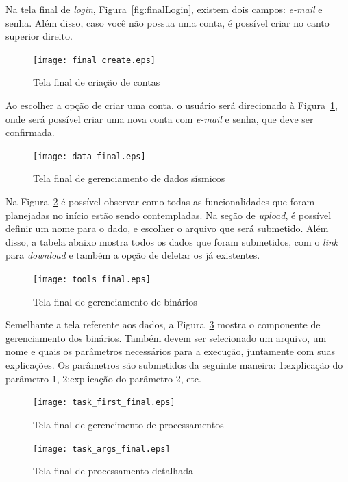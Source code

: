 \documentclass[11pt,twoside]{article}
\begin{document}
Na tela final de \emph{login}, Figura~\ref{fig:finalLogin}, existem dois campos: \emph{e-mail} e senha. Além disso, caso você não possua uma conta, é possível criar no canto superior direito.

\begin{figure}[!h]
  \centering
  \texttt{[image: final\_create.eps]}
  \caption{Tela final de criação de contas}
  \label{fig:finalCreate}
\end{figure}

 Ao escolher a opção de criar uma conta, o usuário será direcionado à Figura~\ref{fig:finalCreate}, onde será possível criar uma nova conta com \emph{e-mail} e senha, que deve ser confirmada.

\begin{figure}[!h]
  \centering
  \texttt{[image: data\_final.eps]}
  \caption{Tela final de gerenciamento de dados sísmicos}
  \label{fig:finalData}
\end{figure}

Na Figura~\ref{fig:finalData} é possível observar como todas as funcionalidades que foram planejadas no início estão sendo contempladas. Na seção de \emph{upload}, é possível definir um nome para o dado, e escolher o 
arquivo que será submetido. Além disso, a tabela abaixo mostra todos os dados que foram submetidos, com o \emph{link} para \emph{download} e também a opção de deletar os já existentes.

\begin{figure}[!h]
  \centering
  \texttt{[image: tools\_final.eps]}
  \caption{Tela final de gerenciamento de binários}
  \label{fig:finalTools}
\end{figure}

Semelhante a tela referente aos dados, a Figura~\ref{fig:finalTools} mostra o componente de gerenciamento dos binários. Também devem
ser selecionado um arquivo, um nome e quais os parâmetros necessários para a execução, juntamente com suas explicações. Os parâmetros são submetidos da seguinte maneira: 1:explicação do parâmetro 1,
2:explicação do parâmetro 2, etc.

\begin{figure}[!h]
  \centering
  \texttt{[image: task\_first\_final.eps]}
  \caption{Tela final de gerencimento de processamentos}
  \label{fig:finalTasks}
\end{figure}

\begin{figure}[!h]
  \centering
  \texttt{[image: task\_args\_final.eps]}
  \caption{Tela final de processamento detalhada}
  \label{fig:finalDetailedTask}
\end{figure}
\end{document}
